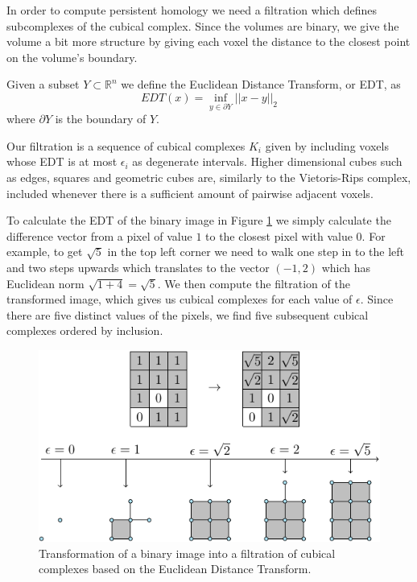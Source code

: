 In order to compute persistent homology we need a filtration which defines subcomplexes of the cubical complex. Since the volumes are binary, we give the volume a bit more structure by giving each voxel the distance to the closest point on the volume's boundary.
\begin{definition}
  Given a subset $Y \subset \mathbb{R}^{n}$ we define the Euclidean Distance Transform, or EDT, as
   \[EDT(x) = \inf_{y \in \partial Y} ||x - y||_2\]
   where $\partial Y$ is the boundary of $Y$.
\end{definition}

Our filtration is a sequence of cubical complexes $K_{i}$ given by including voxels whose EDT is at most $\epsilon_{i}$ as degenerate intervals. Higher dimensional cubes such as edges, squares and geometric cubes are, similarly to the Vietoris-Rips complex, included whenever there is a sufficient amount of pairwise adjacent voxels.

\begin{example}
  To calculate the EDT of the binary image in Figure \ref{edt} we simply calculate the difference vector from a pixel of value $1$ to the closest pixel with value $0$. For example, to get $\sqrt 5$ in the top left corner we need to walk one step in to the left and two steps upwards which translates to the vector $(-1,2)$ which has Euclidean norm $\sqrt{1+4}=\sqrt{5}$. We then compute the filtration of the transformed image, which gives us cubical complexes for each value of $\epsilon$. Since there are five distinct values of the pixels, we find  five subsequent cubical complexes ordered by inclusion.

  \begin{figure}[ht]
    \centering
    \includegraphics[scale=1]{cubicalfiltration.pdf}
    \caption{\label{edt} Transformation of a binary image into a filtration of cubical complexes based on the Euclidean Distance Transform.}
  \end{figure}

\end{example}

